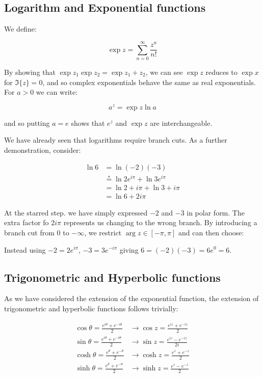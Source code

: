 \documentclass{../../physics_notes}
\begin{document}
\subsection{Logarithm and Exponential functions }

We define:

\[\exp{z} = \sum_{n=0}^\infty \frac{z^n}{n!} \]

By showing that $\exp{z_1}\exp{z_2} = \exp{z_1 + z_2}$, we can see $\exp{z}$ reduces to $\exp{x}$ for $\Im\{z\} = 0$, and so complex exponentials behave the same as real exponentials. For $a > 0$ we can write:

\[ a^z = \exp{z\ln{a}} \]

and so putting $a = e$ shows that $e^z$ and $\exp{z}$ are interchangeable.

We have already seen that logarithms require branch cuts. As a further demonstration, consider:

\begin{align*}
\ln{6} &= \ln{(-2)(-3)} \\
&\stackrel{*}{=} \ln{2e^{i\pi}} + \ln{3e^{i\pi}} \\
&= \ln{2} + i\pi + \ln{3} + i\pi \\
&= \ln{6} + 2i\pi
\end{align*}

At the starred step. we have simply expressed $-2$ and $-3$ in polar form. The extra factor fo $2i\pi$ represents us changing to the wrong branch. By introducing a branch cut from $0$ to $-\infty$, we restrict $\arg{z} \in [-\pi,\pi]$ and can then choose:

Instead using $-2 = 2e^{i\pi}$, $-3 = 3e^{-i\pi}$ giving $6 = (-2)(-3) = 6e^{0} = 6$.

\subsection{Trigonometric and Hyperbolic functions}

As we have considered the extension of the exponential function, the extension of trigonometric and hyperbolic functions follows trivially:

\begin{align*}
\cos{\theta} = \frac{e^{i\theta} + e^{-i\theta}}{2} &\longrightarrow \cos{z} = \frac{e^{iz} + e^{-iz}}{2}\\
\sin{\theta} = \frac{e^{i\theta} + e^{-i\theta}}{2} &\longrightarrow \sin{z} = \frac{e^{iz} - e^{-iz}}{2i}\\
\cosh{\theta} = \frac{e^{\theta} + e^{-\theta}}{2} &\longrightarrow \cosh{z} = \frac{e^{z} + e^{-z}}{2}\\
\sinh{\theta} = \frac{e^{\theta} + e^{-\theta}}{2} &\longrightarrow \sinh{z} = \frac{e^{z} - e^{-z}}{2}
\end{align*}
\end{document}
